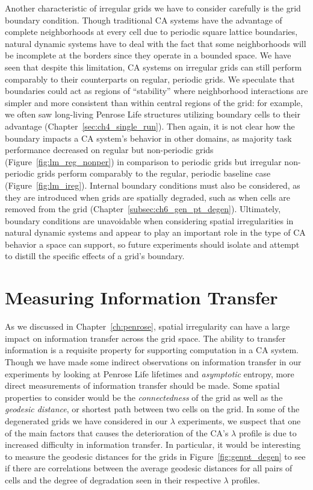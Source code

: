 \documentclass[a4paper,11pt,twoside]{report}
\begin{document}
Another characteristic of irregular grids we have to consider carefully is the grid boundary condition. Though traditional CA systems have the advantage of complete neighborhoods at every cell due to periodic square lattice boundaries, natural dynamic systems have to deal with the fact that some neighborhoods will be incomplete at the borders since they operate in a bounded space. We have seen that despite this limitation, CA systems on irregular grids can still perform comparably to their counterparts on regular, periodic grids.  We speculate that boundaries could act as regions of ``stability'' where neighborhood interactions are simpler and more consistent than within central regions of the grid: for example, we often saw long-living Penrose Life structures utilizing boundary cells to their advantage (Chapter~\ref{sec:ch4_single_run}). Then again, it is not clear how the boundary impacts a CA system's behavior in other domains, as majority task performance decreased on regular but non-periodic grids (Figure~\ref{fig:lm_reg_nonper}) in comparison to periodic grids but irregular non-periodic grids perform comparably to the regular, periodic baseline case (Figure~\ref{fig:lm_ireg}). Internal boundary conditions must also be considered, as they are introduced when grids are spatially degraded, such as when cells are removed from the grid (Chapter~\ref{subsec:ch6_gen_pt_degen}). Ultimately, boundary conditions are unavoidable when considering spatial irregularities in natural dynamic systems and appear to play an important role in the type of CA behavior a space can support, so future experiments should isolate and attempt to distill the specific effects of a grid's boundary.


\section{Measuring Information Transfer}
As we discussed in Chapter~\ref{ch:penrose}, spatial irregularity can have a large impact on information transfer across the grid space. The ability to transfer information is a requisite property for supporting computation in a CA system. Though we have made some indirect observations on information transfer in our experiments by looking at Penrose Life lifetimes and \textit{asymptotic} entropy, more direct measurements of information transfer should be made. Some spatial properties to consider would be the \textit{connectedness} of the grid as well as the \textit{geodesic distance}, or shortest path between two cells on the grid. In some of the degenerated grids we have considered in our $\lambda$ experiments, we suspect that one of the main factors that causes the deterioration of the CA's $\lambda$ profile is due to increased difficulty in information transfer. In particular, it would be interesting to measure the geodesic distances for the grids in Figure~\ref{fig:genpt_degen} to see if there are correlations between the average geodesic distances for all pairs of cells and the degree of degradation seen in their respective $\lambda$ profiles.
\end{document}
